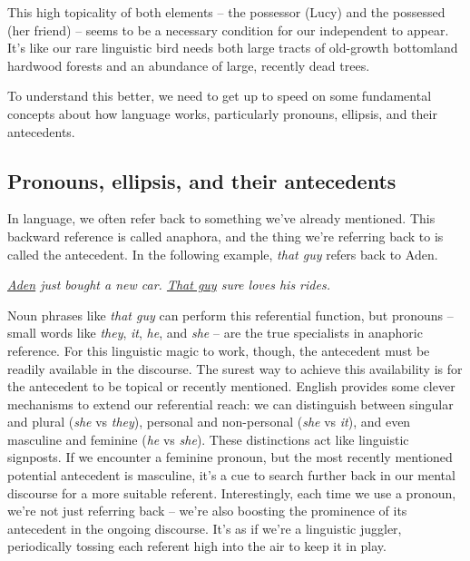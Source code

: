 This high topicality of both elements -- the possessor (Lucy) and the possessed (her friend) -- seems to be a necessary condition for our independent  to appear. It's like our rare linguistic bird needs both large tracts of old-growth bottomland hardwood forests and an abundance of large, recently dead trees.

To understand this better, we need to get up to speed on some fundamental concepts about how language works, particularly pronouns, ellipsis, and their antecedents.

\subsection{Pronouns, ellipsis, and their antecedents}

In language, we often refer back to something we've already mentioned. This backward reference is called anaphora, and the thing we're referring back to is called the antecedent. In the following example, \textit{that guy} refers back to Aden.

\ea \textit{\uline{Aden} just bought a new car. \uline{That guy} sure loves his rides.}\\
    \label{ex:Aden1}
\z

Noun phrases like \textit{that guy} can perform this referential function, but pronouns -- small words like \textit{they}, \textit{it}, \textit{he}, and \textit{she} -- are the true specialists in anaphoric reference. For this linguistic magic to work, though, the antecedent must be readily available in the discourse. The surest way to achieve this availability is for the antecedent to be topical or recently mentioned. English provides some clever mechanisms to extend our referential reach: we can distinguish between singular and plural (\textit{she} vs \textit{they}), personal and non-personal (\textit{she} vs \textit{it}), and even masculine and feminine (\textit{he} vs \textit{she}). These distinctions act like linguistic signposts. If we encounter a feminine pronoun, but the most recently mentioned potential antecedent is masculine, it's a cue to search further back in our mental discourse for a more suitable referent. Interestingly, each time we use a pronoun, we're not just referring back -- we're also boosting the prominence of its antecedent in the ongoing discourse. It's as if we're a linguistic juggler, periodically tossing each referent high into the air to keep it in play.

